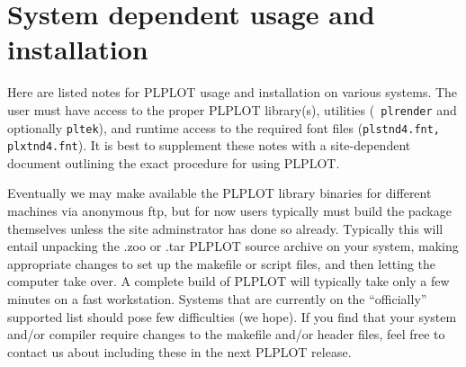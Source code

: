 \chapter{System dependent usage and installation}
\label{ap:sys}

Here are listed notes for PLPLOT usage and installation on various systems.
The user must have access to the proper PLPLOT library(s), utilities ({\tt
plrender} and optionally {\tt pltek}), and runtime access to the required
font files ({\tt plstnd4.fnt, plxtnd4.fnt}).  It is best to supplement these
notes with a site-dependent document outlining the exact procedure for using
PLPLOT.

Eventually we may make available the PLPLOT library binaries for different
machines via anonymous ftp, but for now users typically must build the
package themselves unless the site adminstrator has done so already.
Typically this will entail unpacking the .zoo or .tar PLPLOT source archive
on your system, making appropriate changes to set up the makefile or script
files, and then letting the computer take over.  A complete build of PLPLOT
will typically take only a few minutes on a fast workstation.  Systems
that are currently on the ``officially'' supported list should pose few
difficulties (we hope).  If you find that your system and/or compiler
require changes to the makefile and/or header files, feel free to contact us
about including these in the next PLPLOT release.








